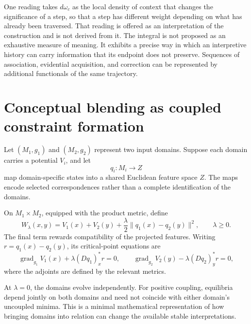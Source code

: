 \documentclass[11pt]{article}
\begin{document}
One reading takes $d\omega_c$ as the local density of context that changes the significance of a step, so that a step has different weight depending on what has already been traversed. That reading is offered as an interpretation of the construction and is not derived from it. The integral is not proposed as an exhaustive measure of meaning. It exhibits a precise way in which an interpretive history can carry information that its endpoint does not preserve. Sequences of association, evidential acquisition, and correction can be represented by additional functionals of the same trajectory.

\section{Conceptual blending as coupled constraint formation}

Let $(M_1,g_1)$ and $(M_2,g_2)$ represent two input domains. Suppose each domain carries a potential $V_i$, and let
\[
q_i\colon M_i\longrightarrow Z
\]
map domain-specific states into a shared Euclidean feature space $Z$. The maps encode selected correspondences rather than a complete identification of the domains.

On $M_1\times M_2$, equipped with the product metric, define
\[
W_\lambda(x,y)
=
V_1(x)+V_2(y)
+
\frac{\lambda}{2}
\|q_1(x)-q_2(y)\|^2,
\qquad
\lambda\geq 0.
\]
The final term rewards compatibility of the projected features. Writing $r=q_1(x)-q_2(y)$, its critical-point equations are
\[
\operatorname{grad}_{g_1}V_1(x)
+
\lambda(Dq_1)_x^*r
=0,
\qquad
\operatorname{grad}_{g_2}V_2(y)
-
\lambda(Dq_2)_y^*r
=0,
\]
where the adjoints are defined by the relevant metrics.

At $\lambda=0$, the domains evolve independently. For positive coupling, equilibria depend jointly on both domains and need not coincide with either domain's uncoupled minima. This is a minimal mathematical representation of how bringing domains into relation can change the available stable interpretations.
\end{document}
